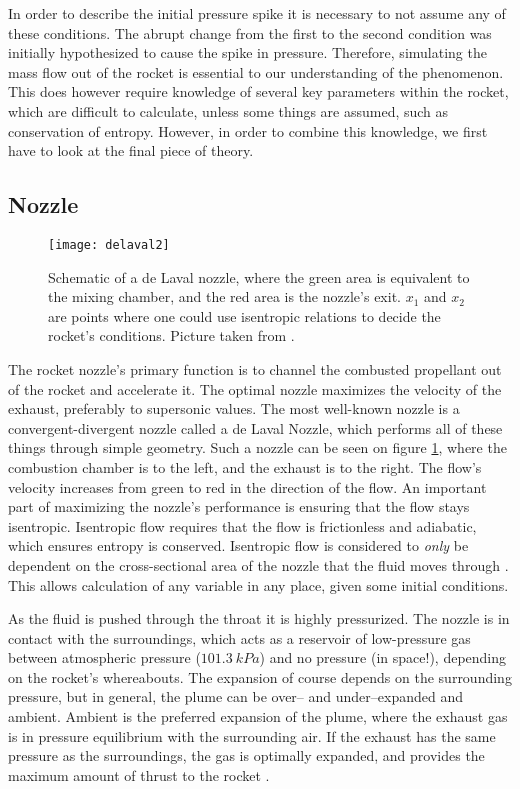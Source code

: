 	In order to describe the initial pressure spike it is necessary to not assume any of these conditions. The abrupt change from the first to the second condition was initially hypothesized to cause the spike in pressure. Therefore, simulating the mass flow out of the rocket is essential to our understanding of the phenomenon. This does however require knowledge of several key parameters within the rocket, which are difficult to calculate, unless some things are assumed, such as conservation of entropy. However, in order to combine this knowledge, we first have to look at the final piece of theory.

\subsection{Nozzle}

	\begin{figure}
		\texttt{[image: delaval2]}
		\caption{Schematic of a de Laval nozzle, where the green area is equivalent to the mixing chamber, and the red area is the nozzle's exit. $x_1$ and $x_2$ are points where one could use isentropic relations to decide the rocket's conditions. Picture taken from \cite{wikidelaval}.}
		\label{fig:delaval}
	\end{figure}

	The rocket nozzle's primary function is to channel the combusted propellant out of the rocket and accelerate it. The optimal nozzle maximizes the velocity of the exhaust, preferably to supersonic values. The most well-known nozzle is a convergent-divergent nozzle called a de Laval Nozzle, which performs all of these things through simple geometry. Such a nozzle can be seen on figure \ref{fig:delaval}, where the combustion chamber is to the left, and the exhaust is to the right. The flow's velocity increases from green to red in the direction of the flow. An important part of maximizing the nozzle's performance is ensuring that the flow stays isentropic. Isentropic flow requires that the flow is frictionless and adiabatic, which ensures entropy is conserved. Isentropic flow is considered to \emph{only} be dependent on the cross-sectional area of the nozzle that the fluid moves through \cite{nakkanozz}. This allows calculation of any variable in any place, given some initial conditions.

	As the fluid is pushed through the throat it is highly pressurized. The nozzle is in contact with the surroundings, which acts as a reservoir of low-pressure gas between atmospheric pressure ($\SI{101.3}{kPa}$)
	and no pressure (in space!), depending on the rocket's whereabouts. The expansion of course depends on the surrounding pressure, but in general, the plume can be over-- and under--expanded and ambient. Ambient is the preferred expansion of the plume, where the exhaust gas is in pressure equilibrium with the surrounding air. If the exhaust has the same pressure as the surroundings, the gas is optimally expanded, and provides the maximum amount of thrust to the rocket \cite{robertnozzle}.

